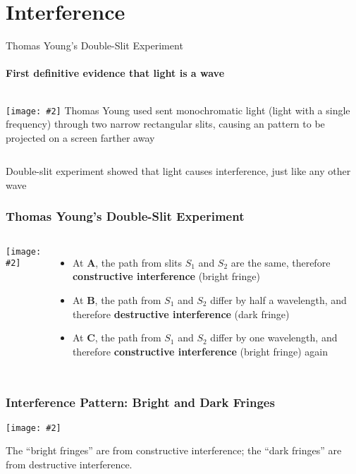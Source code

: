 \documentclass[compress,aspectratio=169]{beamer}
\newcommand{\pic}[2]{\texttt{[image: \#2]}}
\begin{document}
\section{Interference}

\begin{frame}{Thomas Young's Double-Slit Experiment}
  \framesubtitle{First definitive evidence that light is a wave}
  \begin{columns}
    \pic{1}{double-slit1.png}
    Thomas Young used sent monochromatic light (light with a single frequency)
    through two narrow rectangular slits, causing an pattern to be projected on
    a screen farther away
  \end{columns}

  \vspace{.15in}Double-slit experiment showed that light causes interference,
  just like any other wave
\end{frame}

\begin{frame}
  \frametitle{Thomas Young's Double-Slit Experiment}
  \begin{columns}
    \pic{1.2}{path1.png}
    \begin{itemize}
    \item At \textbf{A}, the path from slits $S_1$ and $S_2$ are the same,
      therefore \textbf{constructive interference} (bright fringe)
    \item At \textbf{B}, the path from $S_1$ and $S_2$ differ by half a
      wavelength, and therefore \textbf{destructive interference} (dark fringe)
    \item At \textbf{C}, the path from $S_1$ and $S_2$ differ by one
      wavelength, and therefore \textbf{constructive interference} (bright
      fringe) again
    \end{itemize}
  \end{columns}
\end{frame}

\begin{frame}
  \frametitle{Interference Pattern: Bright and Dark Fringes}
  \begin{center}
    \pic{.4}{fringes1.png}
  \end{center}
  The ``bright fringes'' are from constructive interference; the ``dark
  fringes'' are from destructive interference.
\end{frame}
\end{document}
